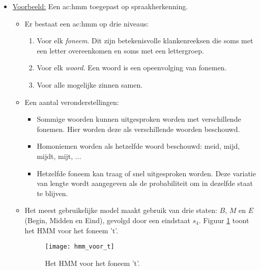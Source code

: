 \begin{itemize}
	\item \underline{Voorbeeld:} Een \gls{ac:hmm} toegepast op spraakherkenning.
	\begin{itemize}
		\item Er bestaat een \gls{ac:hmm} op drie niveaus:
		\begin{enumerate}
			\item Voor elk \textit{foneem}. Dit zijn betekenisvolle klankenreeksen die soms met een letter overeenkomen en soms met een lettergroep.
			\item Voor elk \textit{woord}. Een woord is een opeenvolging van fonemen. 
			\item Voor alle mogelijke zinnen samen.
		\end{enumerate}
		\item Een aantal veronderstellingen:
		\begin{itemize}
			\item Sommige woorden kunnen uitgesproken worden met verschillende fonemen. Hier worden deze als verschillende woorden beschouwd.
			\item Homoniemen worden als hetzelfde woord beschouwd: meid, mijd, mijdt, mijt, ...
			\item Hetzelfde foneem kan traag of snel uitgesproken worden. Deze variatie van lengte wordt aangegeven als de probabiliteit om in dezelfde staat te blijven.
		\end{itemize}
		\item Het meest gebruikelijke model maakt gebruik van drie staten: $B$, $M$ en $E$ (Begin, Midden en Eind), gevolgd door een eindstaat $s_4$. Figuur \ref{fig:hmm_voor_t} toont het HMM voor het foneem 't'.
		\begin{figure}
			\texttt{[image: hmm\_voor\_t]}
			\caption{Het HMM voor het foneem 't'.}
			\label{fig:hmm_voor_t}
		\end{figure}
	

\end{itemize}
\end{itemize}

